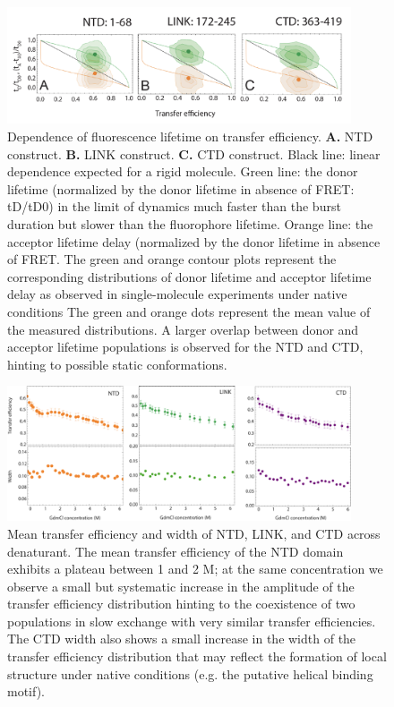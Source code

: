 \documentclass[../main.tex]{subfiles}
\begin{document}
        \begin{figure}[!htb] %
            \centering
            \includegraphics[width=4in]{appendix-e-fig7.png}
            \caption[Dependence of fluorescence lifetime on transfer efficiency.]
                {Dependence of fluorescence lifetime on transfer efficiency. \textbf{A.} NTD construct. \textbf{B.} LINK construct. \textbf{C.} CTD construct. Black line: linear dependence expected for a rigid molecule. Green line: the donor lifetime (normalized by the donor lifetime in absence of FRET: tD/tD0) in the limit of dynamics much faster than the burst duration but slower than the fluorophore lifetime. Orange line: the acceptor lifetime delay (normalized by the donor lifetime in absence of FRET. The green and orange contour plots represent the corresponding distributions of donor lifetime and acceptor lifetime delay as observed in single-molecule experiments under native conditions The green and orange dots represent the mean value of the measured distributions. A larger overlap between donor and acceptor lifetime populations is observed for the NTD and CTD, hinting to possible static conformations.}
            \label{fig:appendix-e-fig7}
        \end{figure}

        \begin{figure}[!htb] %
            \centering
            \includegraphics[width=4in]{appendix-e-fig8.png}
            \caption[Mean transfer efficiency and width of NTD, LINK, and CTD across denaturant.]
                {Mean transfer efficiency and width of NTD, LINK, and CTD across denaturant. The mean transfer efficiency of the NTD domain exhibits a plateau between 1 and 2 M; at the same concentration we observe a small but systematic increase in the amplitude of the transfer efficiency distribution hinting to the coexistence of two populations in slow exchange with very similar transfer efficiencies. The CTD width also shows a small increase in the width of the transfer efficiency distribution that may reflect the formation of local structure under native conditions (e.g. the putative helical binding motif).}
            \label{fig:appendix-e-fig8}
        \end{figure}
\end{document}
